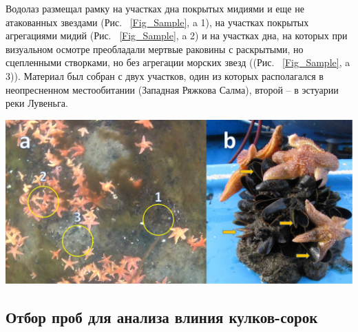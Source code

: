 \documentclass[a0,portrait]{a0poster}
\begin{document}
\begin{multicols}{2}
%
\begin{minipage}[t]{0.4\linewidth}
Водолаз размещал рамку на участках дна покрытых мидиями и еще не атакованных звездами (Рис. ~\ref{Fig_Sample}, a 1), на участках покрытых агрегациями мидий  (Рис. ~\ref{Fig_Sample}, a 2) и на участках дна, на которых при визуальном осмотре преобладали мертвые раковины с раскрытыми, но сцепленными створками, но без агрегации морских звезд ((Рис. ~\ref{Fig_Sample}, a 3)). Материал был собран с двух участков, один из которых располагался в неопресненном местообитании (Западная Ряжкова Салма), второй -- в эстуарии реки Лувеньга.
\end{minipage}\hspace{1cm}
%
\begin{minipage}[t]{0.5\linewidth}		
	\begin{center}\vspace{0.1cm}
			\includegraphics[width=0.8\linewidth]{Samples.jpg}
			\label{Fig_Sample}
		\end{center}
\end{minipage}\hspace{0.5cm}



\subsection*{Отбор проб для анализа влиния кулков-сорок}


\end{multicols}
\end{document}
